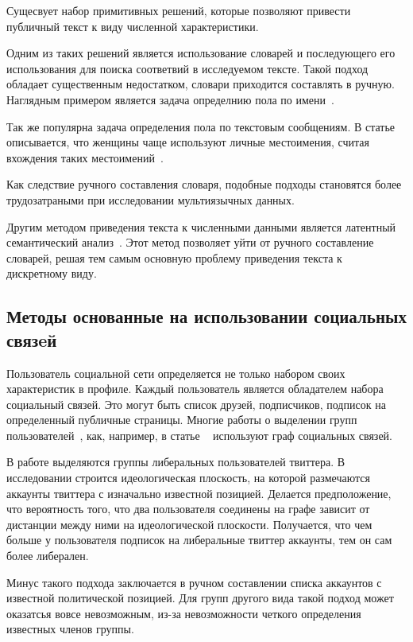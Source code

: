 \documentclass[annotation,times,page4]{itmo-student-thesis}
\begin{document}
Сущесвует набор примитивных решений, которые позволяют привести публичный текст к виду численной характеристики. 

Одним из таких решений является использование словарей и последующего его использования для поиска соответвий в исследуемом тексте. Такой подход обладает существенным недостатком, словари приходится составлять в ручную. Наглядным примером является задача определнию пола по имени~\cite{loan2013knowing}. 

Так же популярна задача определения пола по текстовым сообщениям. В статье описывается, что женщины чаще используют личные местоимения, считая вхождения таких местоимений~\cite{pennebaker2011your}.

Как следствие ручного составления словаря, подобные подходы становятся более трудозатраными при исследовании мультиязычных данных.

Другим методом приведения текста к численными данными является латентный семантический анализ~\cite{farseev2015harvesting}. Этот метод позволяет уйти от ручного составление словарей, решая тем самым основную проблему приведения текста к дискретному виду.
  
\subsection{Методы основанные на использовании социальных связeй}
Пользователь социальной сети определяется не только набором своих характеристик в профиле. Каждый пользователь является обладателем набора социальный связей. Это могут быть список друзей, подписчиков, подписок на определенный публичные страницы. Многие работы о выделении групп пользователей~\cite{trusov2010determining}, как, например, в статье ~\cite{barbera2015tweeting} используют граф социальных связей.

В работе выделяются группы либеральных пользователей твиттера. В исследовании строится идеологическая плоскость, на которой размечаются аккаунты твиттера с изначально известной позицией. Делается предположение, что вероятность того, что два пользователя соединены на графе зависит от дистанции между ними на идеологической плоскости. Получается, что чем больше у пользователя подписок на либеральные твиттер аккаунты, тем он сам более либерален.

Минус такого подхода заключается в ручном составлении списка аккаунтов с известной политической позицией. Для групп другого вида такой подход может оказатсья вовсе невозможным, из-за невозможности четкого определения известных членов группы.
\end{document}
